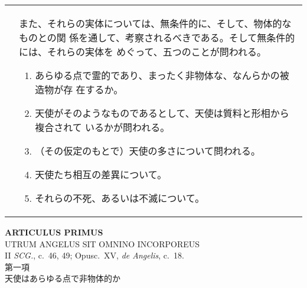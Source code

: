\documentclass[10pt]{jsarticle} %
\begin{document}
\begin{longtable}{p{21em}p{21em}}
&

 また、それらの実体については、無条件的に、そして、物体的なものとの関
 係を通して、考察されるべきである。そして無条件的には、それらの実体を
 めぐって、五つのことが問われる。

\begin{enumerate}
 \item あらゆる点で霊的であり、まったく非物体な、なんらかの被造物が存
 在するか。
 \item 天使がそのようなものであるとして、天使は質料と形相から複合されて
       いるかが問われる。
 \item （その仮定のもとで）天使の多さについて問われる。
 \item 天使たち相互の差異について。
 \item それらの不死、あるいは不滅について。

\end{enumerate}

\end{longtable}

\newpage


\begin{center}
 {\Large {\bf ARTICULUS PRIMUS}}\\
 {\large UTRUM ANGELUS SIT OMNINO INCORPOREUS}\\
 {\footnotesize II {\itshape SCG.}, c.~46, 49; Opusc.~XV, {\itshape de
 Angelis}, c.~18.}\\
 {\Large 第一項\\天使はあらゆる点で非物体的か}
\end{center}
\end{document}
